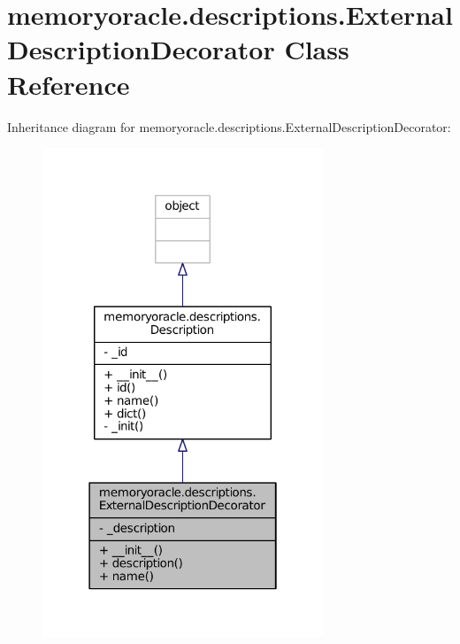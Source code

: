 \hypertarget{classmemoryoracle_1_1descriptions_1_1ExternalDescriptionDecorator}{}\section{memoryoracle.\+descriptions.\+External\+Description\+Decorator Class Reference}
\label{classmemoryoracle_1_1descriptions_1_1ExternalDescriptionDecorator}


Inheritance diagram for memoryoracle.\+descriptions.\+External\+Description\+Decorator\+:\nopagebreak
\begin{figure}[H]
\begin{center}
\leavevmode
\includegraphics[width=238pt]{classmemoryoracle_1_1descriptions_1_1ExternalDescriptionDecorator__inherit__graph}
\end{center}
\end{figure}


